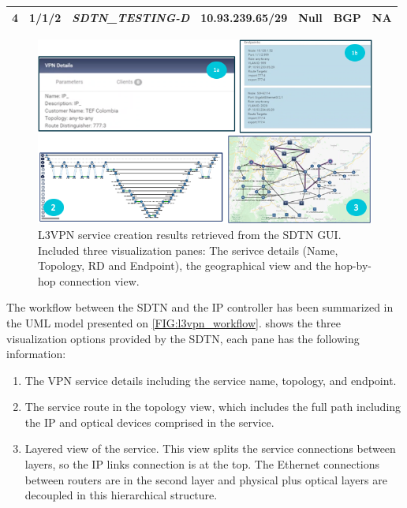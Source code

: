 \documentclass[a4paper,fleqn]{cas-dc}
\begin{document}
\begin{table}[]
\begin{tabular}{c|c|c|l|c|cl}
\multicolumn{1}{|c|}{\multirow{-2}{*}{\textbf{4}}}          & 1/1/2                                                           & \multirow{-2}{*}{\textit{SDTN\_TESTING-D}}                & 10.93.239.65/29       & \multirow{-2}{*}{Null}                                          & \multicolumn{1}{c|}{\multirow{-2}{*}{BGP}}                          & \multicolumn{1}{l|}{\multirow{-2}{*}{NA}}                     \\ \hline
\end{tabular}
\label{TAB:discovered_ip_l3vpn}
\end{table}


\begin{figure}
	\centering
		\includegraphics[width=\linewidth]{figs/l3vpn_results_3.png}
	\caption{L3VPN service creation results retrieved from the SDTN GUI. Included three visualization panes: The serivce details (Name, Topology, RD and Endpoint), the geographical view and the hop-by-hop connection view.}
	\label{FIG:l3vpn_results}
\end{figure}

The workflow between the SDTN and the IP controller has been summarized in the UML model presented on \cref{FIG:l3vpn_workflow}.  shows the three visualization options provided by the SDTN, each pane has the following information:
\begin{enumerate}
    \item The VPN service details including the service name, topology, and endpoint.
    \item The service route in the topology view, which includes the full path including the IP and optical devices comprised in the service.
    \item Layered view of the service. This view splits the service connections between layers, so the IP links connection is at the top. The Ethernet connections between routers are in the second layer and physical plus optical layers are decoupled in this hierarchical structure.
\end{enumerate}
\end{document}
